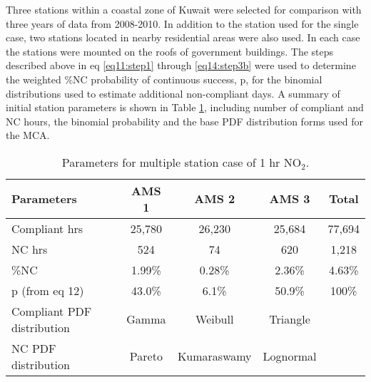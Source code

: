 Three stations within a coastal zone of Kuwait were selected for comparison with three years of data from 2008-2010. In addition to the station used for the single case, two stations located in nearby residential areas were also used. In each case the stations were mounted on the roofs of government buildings. The steps described above in eq \ref{eq11:step1} through \ref{eq14:step3b} were used to determine the weighted \%NC probability of continuous success, p, for the binomial distributions used to estimate additional non-compliant days. A summary of initial station parameters is shown in Table \ref{tb10:multiParaNO2}, including number of compliant and NC hours, the binomial probability and the base PDF distribution forms used for the MCA.
% 
\begin{table}[H]
\centering
\caption{Parameters for multiple station case of 1 hr NO$_{2}$.}
\label{tb10:multiParaNO2}
\begin{tabular}{@{}lcccc@{}}
\toprule
\textbf{Parameters} & \textbf{AMS 1} & \textbf{AMS 2} & \textbf{AMS 3} & \textbf{Total} \\ \midrule
Compliant hrs & 25,780 & 26,230 & 25,684 & 77,694 \\
NC hrs & 524 & 74 & 620 & 1,218 \\
\%NC & 1.99\% & 0.28\% & 2.36\% & 4.63\% \\
p (from eq 12) & 43.0\% & 6.1\% & 50.9\% & 100\% \\
Compliant PDF distribution & Gamma & Weibull & Triangle &  \\
NC PDF distribution & Pareto & Kumaraswamy & Lognormal &  \\ \bottomrule
\end{tabular}
\end{table} 

